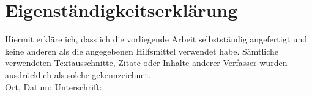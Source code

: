 \newpage
\section*{Eigenständigkeitserklärung}
Hiermit erkläre ich, dass ich die vorliegende Arbeit selbstständig angefertigt und keine anderen als die
angegebenen Hilfsmittel verwendet habe. Sämtliche verwendeten Textausschnitte, Zitate oder Inhalte anderer Verfasser wurden ausdrücklich als solche gekennzeichnet.\\
\vspace{5cm}
Ort, Datum: \hspace{6cm} Unterschrift:
\newpage